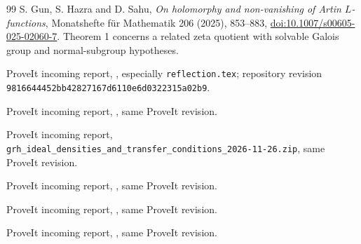 \begin{thebibliography}{99}
 S. Gun, S. Hazra and D. Sahu,
\emph{On holomorphy and non-vanishing of Artin $L$-functions},
Monatshefte f\"ur Mathematik 206 (2025), 853--883,
\href{https://doi.org/10.1007/s00605-025-02060-7}{doi:10.1007/s00605-025-02060-7}.
Theorem 1 concerns a related zeta quotient with solvable Galois group
and normal-subgroup hypotheses.

 ProveIt incoming report,
,
especially \texttt{reflection.tex}; repository revision
\texttt{9816644452bb42827167d6110e6d0322315a02b9}.

 ProveIt incoming report,
,
same ProveIt revision.

 ProveIt incoming report,
{\texttt{grh\_ideal\_densities\_and\_transfer\_conditions\_2026-11-26.zip}},
same ProveIt revision.

 ProveIt incoming report,
,
same ProveIt revision.

 ProveIt incoming report,
,
same ProveIt revision.

 ProveIt incoming report,
,
same ProveIt revision.
\end{thebibliography}

